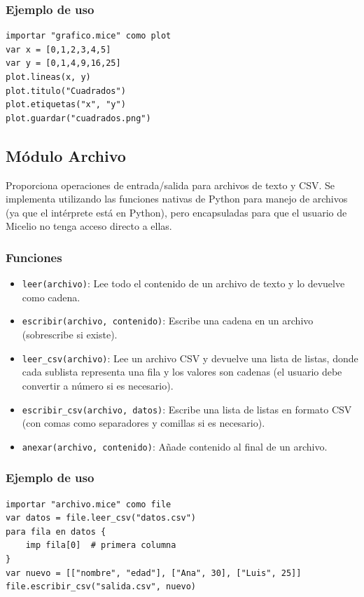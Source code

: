 \documentclass[12pt]{article}
\begin{document}
\subsubsection*{Ejemplo de uso}
\begin{lstlisting}
importar "grafico.mice" como plot
var x = [0,1,2,3,4,5]
var y = [0,1,4,9,16,25]
plot.lineas(x, y)
plot.titulo("Cuadrados")
plot.etiquetas("x", "y")
plot.guardar("cuadrados.png")
\end{lstlisting}

\subsection{Módulo Archivo}

Proporciona operaciones de entrada/salida para archivos de texto y CSV. Se implementa utilizando las funciones nativas de Python para manejo de archivos (ya que el intérprete está en Python), pero encapsuladas para que el usuario de Micelio no tenga acceso directo a ellas.

\subsubsection*{Funciones}
\begin{itemize}
    \item \texttt{leer(archivo)}: Lee todo el contenido de un archivo de texto y lo devuelve como cadena.
    \item \texttt{escribir(archivo, contenido)}: Escribe una cadena en un archivo (sobrescribe si existe).
    \item \texttt{leer\_csv(archivo)}: Lee un archivo CSV y devuelve una lista de listas, donde cada sublista representa una fila y los valores son cadenas (el usuario debe convertir a número si es necesario).
    \item \texttt{escribir\_csv(archivo, datos)}: Escribe una lista de listas en formato CSV (con comas como separadores y comillas si es necesario).
    \item \texttt{anexar(archivo, contenido)}: Añade contenido al final de un archivo.
\end{itemize}

\subsubsection*{Ejemplo de uso}
\begin{lstlisting}
importar "archivo.mice" como file
var datos = file.leer_csv("datos.csv")
para fila en datos {
    imp fila[0]  # primera columna
}
var nuevo = [["nombre", "edad"], ["Ana", 30], ["Luis", 25]]
file.escribir_csv("salida.csv", nuevo)
\end{lstlisting}
\end{document}
